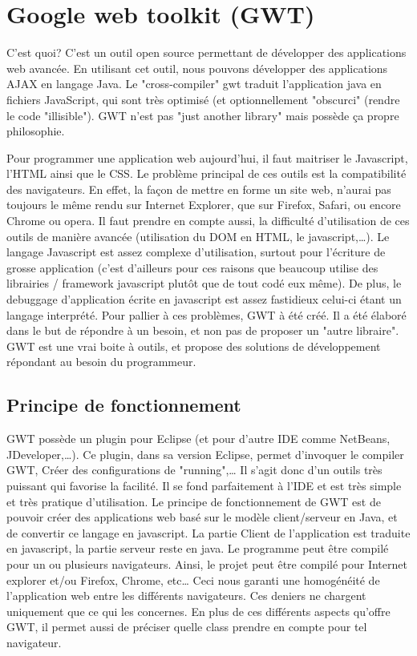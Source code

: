 \section{Google web toolkit (GWT)}

	C'est quoi?
C'est un outil open source permettant de développer des applications web avancée. En utilisant cet outil, nous pouvons développer des applications AJAX en langage Java. 
Le "cross-compiler" gwt traduit l'application java en fichiers JavaScript, qui sont très optimisé (et optionnellement "obscurci" (rendre le code "illisible").
GWT n'est pas "just another library" mais possède ça propre philosophie.

Pour programmer une application web aujourd'hui, il faut maitriser le Javascript, l'HTML ainsi que le CSS. Le problème principal de ces outils est la compatibilité des navigateurs. En effet, la façon de mettre en forme un site web, n'aurai pas toujours le même rendu sur Internet Explorer, que sur Firefox, Safari, ou encore Chrome ou opera. Il faut prendre en compte aussi, la difficulté d'utilisation de ces outils de manière avancée (utilisation du DOM en HTML, le javascript,…). Le langage Javascript est assez complexe d'utilisation, surtout pour l'écriture de grosse application (c'est d'ailleurs pour ces raisons que beaucoup utilise des librairies / framework javascript plutôt que de tout codé eux même). De plus, le debuggage d'application écrite en javascript est assez fastidieux celui-ci étant un langage interprété. Pour pallier à ces problèmes, GWT à été créé. Il a été élaboré dans le but de répondre à un besoin, et non pas de proposer un "autre libraire". GWT est une vrai boite à outils, et propose des solutions de développement répondant au besoin du programmeur.

\subsection{Principe de fonctionnement}
GWT possède un plugin pour Eclipse (et pour d'autre IDE comme NetBeans, JDeveloper,…). Ce plugin, dans sa version Eclipse, permet d'invoquer le compiler GWT, Créer des configurations de "running",… Il s'agit donc d'un outils très puissant qui favorise la facilité. Il se fond parfaitement à l'IDE et est très simple et très pratique d'utilisation.
Le principe de fonctionnement de GWT est de pouvoir créer des applications web basé sur le modèle client/serveur en Java, et de convertir ce langage en javascript. La partie Client de l'application est traduite en javascript, la partie serveur reste en java. Le programme peut être compilé pour un ou plusieurs navigateurs. Ainsi, le projet peut être compilé pour Internet explorer et/ou Firefox, Chrome, etc… Ceci nous garanti une homogénéité de l'application web entre les différents navigateurs. Ces deniers ne chargent uniquement que ce qui les concernes. En plus de ces différents aspects qu'offre GWT, il permet aussi de préciser quelle class prendre en compte pour tel navigateur.

